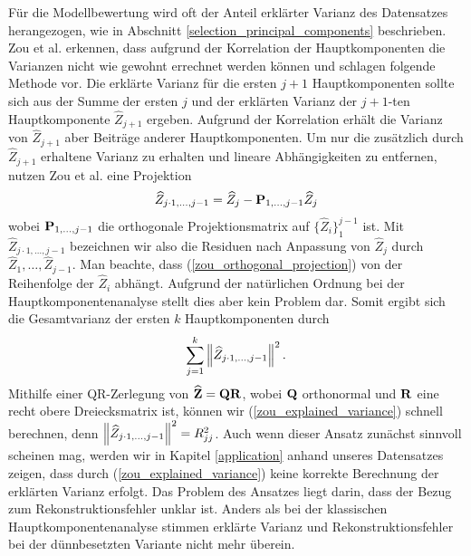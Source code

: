 Für die Modellbewertung wird oft der Anteil erklärter Varianz des Datensatzes herangezogen, wie in Abschnitt \ref{selection_principal_components} beschrieben. Zou et al. erkennen, dass aufgrund der Korrelation der Hauptkomponenten die Varianzen nicht wie gewohnt errechnet werden können und schlagen folgende Methode vor. Die erklärte Varianz für die ersten $j+1$ Hauptkomponenten sollte sich aus der Summe der ersten $j$ und der erklärten Varianz der $j+1$-ten Hauptkomponente $\widehat{Z}_{j+1}$ ergeben. Aufgrund der Korrelation erhält die Varianz von $\widehat{Z}_{j+1}$ aber Beiträge anderer Hauptkomponenten. Um nur die zusätzlich durch $\widehat{Z}_{j+1}$ erhaltene Varianz zu erhalten und lineare Abhängigkeiten zu entfernen, nutzen Zou et al. eine Projektion
\begin{align}
\label{zou_orthogonal_projection}
\widehat{Z}_{j\cdot 1, \ldots, j-1} = \widehat{Z}_j - \mathbf{P}_{1, \ldots, j-1}\widehat{Z}_j
\end{align}
wobei $\mathbf{P}_{1, \ldots, j-1}$ die orthogonale Projektionsmatrix auf $\{\widehat{Z}_i\}_1^{j-1}$ ist. Mit $\widehat{Z}_{j\cdot 1, \ldots, j-1}$ bezeichnen wir also die Residuen nach Anpassung von $\widehat{Z}_j$ durch $\widehat{Z}_1, \ldots, \widehat{Z}_{j-1}$. Man beachte, dass (\ref{zou_orthogonal_projection}) von der Reihenfolge der $\widehat{Z}_i$ abhängt. Aufgrund der natürlichen Ordnung bei der Hauptkomponentenanalyse stellt dies aber kein Problem dar.
Somit ergibt sich die Gesamtvarianz der ersten $k$ Hauptkomponenten durch 
\begin{align}
\label{zou_explained_variance}
\sum_{j=1}^k \left\lVert \widehat{Z}_{j\cdot 1, \ldots, j-1} \right\rVert^2.
\end{align}
Mithilfe einer QR-Zerlegung von $\widehat{\mathbf{Z}} = \mathbf{Q} \mathbf{R}$, wobei $\mathbf{Q}$ orthonormal und $\mathbf{R}$ eine recht obere Dreiecksmatrix ist, können wir (\ref{zou_explained_variance}) schnell berechnen, denn $\left\lVert \widehat{Z}_{j\cdot 1, \ldots, j-1} \right\rVert^2 = R_{jj}^2$. Auch wenn dieser Ansatz zunächst sinnvoll scheinen mag, werden wir in Kapitel \ref{application} anhand unseres Datensatzes zeigen, dass durch (\ref{zou_explained_variance}) keine korrekte Berechnung der erklärten Varianz erfolgt. Das Problem des Ansatzes liegt darin, dass der Bezug zum Rekonstruktionsfehler unklar ist. Anders als bei der klassischen Hauptkomponentenanalyse stimmen erklärte Varianz und Rekonstruktionsfehler bei der dünnbesetzten Variante nicht mehr überein.

